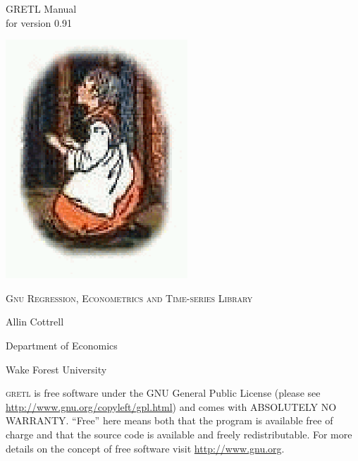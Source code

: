 \documentclass{article}
\begin{document}
\setcounter{page}{-1}
\thispagestyle{empty}

\vspace*{1in}
\begin{center}

\textsf{\Huge GRETL Manual} \\ \vspace{.15in}
{\Large for version 0.91} 

\vspace{.4in}

\includegraphics{gretl-logo}

\vspace{.4in}

{\Large

\textsc{Gnu Regression, Econometrics and Time-series Library}

\vspace{.5in}

Allin Cottrell

Department of Economics

Wake Forest University

}

\end{center}

\vspace{.7in}

\noindent
\textsc{gretl} is free software under the GNU General Public License
(please see \url{http://www.gnu.org/copyleft/gpl.html}) and comes with
ABSOLUTELY NO WARRANTY.  ``Free'' here means both that the program is
available free of charge and that the source code is available and
freely redistributable.  For more details on the concept of free
software visit \url{http://www.gnu.org}. 
\end{document}

